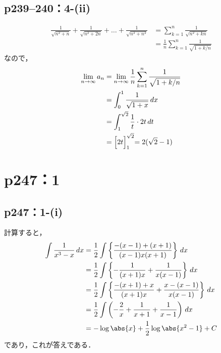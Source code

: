 \documentclass[a4paper,10pt,fleqn]{ltjsarticle}
\begin{document}
\subsection*{p239--240：4-(ii)}

\begin{tleftbar}
    \begin{align*}
        \frac{1}{\sqrt{n^2+n}}+\frac{1}{\sqrt{n^2+2n}}+\dots+\frac{1}{\sqrt{n^2+n^2}} & = \sum_{k=1}^{n} \frac{1}{\sqrt{n^2+kn}}            \\
                                                                                      & = \frac{1}{n} \sum_{k=1}^{n} \frac{1}{\sqrt{1+k/n}}
    \end{align*}
    なので，
    \begin{align*}
        \lim_{n \to \infty} a_n & = \lim_{n \to \infty} \frac{1}{n} \sum_{k=1}^{n} \frac{1}{\sqrt{1+k/n}} \\
                                & =\int_{0}^{1} \frac{1}{\sqrt{1+x}} \, dx                                \\
                                & =\int_{1}^{\sqrt{2}} \frac{1}{t} \cdot 2t \, dt                         \\
                                & = \Bigl[2t \Bigl ]_{1}^{\sqrt{2}} =2(\sqrt{2}-1)
    \end{align*}
\end{tleftbar}


\section*{p247：1}


\subsection*{p247：1-(i)}

\begin{tleftbar}
    計算すると，
    \begin{align*}
        \int \frac{1}{x^3-x} \, dx & = \frac{1}{2} \int \left \{ \frac{-(x-1)+(x+1)}{(x-1)x(x+1)} \right \} \, dx                 \\
                                   & = \frac{1}{2} \int \left \{ -\frac{1}{(x+1)x}+\frac{1}{x(x-1)} \right \} \, dx               \\
                                   & = \frac{1}{2} \int \left \{ \frac{-(x+1)+x}{(x+1)x} + \frac{x-(x-1)}{x(x-1)} \right \} \, dx \\
                                   & = \frac{1}{2} \int \left ( -\frac{2}{x}+\frac{1}{x+1}+\frac{1}{x-1} \right) \, dx            \\
                                   & = -\log \abs{x} + \frac{1}{2} \log \abs{x^2-1}+ C
    \end{align*}
    であり，これが答えである．
\end{tleftbar}
\end{document}
